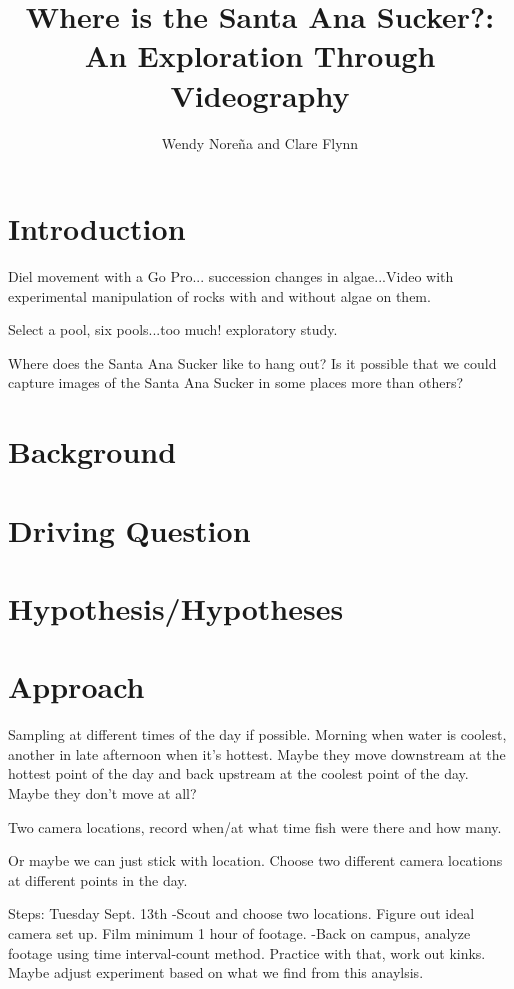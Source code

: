 \documentclass{tufte-handout}\usepackage[]{graphicx}\usepackage[]{color}
\title{Where is the Santa Ana Sucker?: An Exploration Through Videography}
\author{Wendy Nore\~{n}a and Clare Flynn}
\begin{document}

\maketitle

\section{Introduction}


  Diel movement with a Go Pro... succession changes in algae...Video with experimental manipulation of rocks with and without algae on them. 
  
  Select a pool, six pools...too much!  exploratory study.
  
  
Where does the Santa Ana Sucker like to hang out? Is it possible that we could capture images of the Santa Ana Sucker in some places more than others?

\section{Background}

\section{Driving Question}

\section{Hypothesis/Hypotheses}

\section{Approach}

Sampling at different times of the day if possible. Morning when water is coolest, another in late afternoon when it's hottest. Maybe they move downstream at the hottest point of the day and back upstream at the coolest point of the day. Maybe they don't move at all?

Two camera locations, record when/at what time fish were there and how many. 


Or maybe we can just stick with location. Choose two different camera locations at different points in the day. 


Steps:
Tuesday Sept. 13th
-Scout and choose two locations. Figure out ideal camera set up. Film minimum 1 hour of footage.
-Back on campus, analyze footage using time interval-count method. Practice with that, work out kinks. Maybe adjust experiment based on what we find from this anaylsis.
\end{document}
